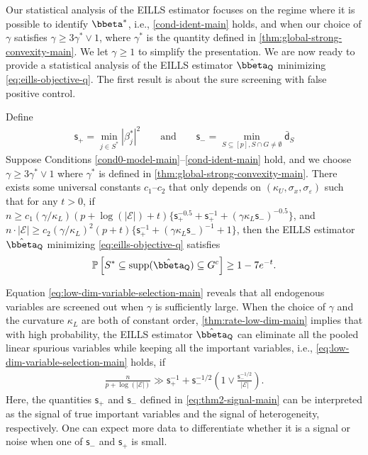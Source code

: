 \documentclass[10pt]{article}
\numberwithin{equation}{section}
\newcommand*{\supp}{\mathrm{supp}}
\begin{document}
{Our statistical analysis of the EILLS estimator focuses on the regime where it is possible to identify $\bbeta^*$, i.e., \cref{cond-ident-main} holds, and when our choice of $\gamma$ satisfies $\gamma \ge 3\gamma^* \lor 1$, where $\gamma^*$ is the quantity defined in  \cref{thm:global-strong-convexity-main}. We let $\gamma \ge 1$ to simplify the presentation. We are now ready to provide a statistical analysis of the EILLS estimator $\hat{\bbeta}_{\mathsf{Q}}$ minimizing \eqref{eq:eills-objective-q}.  The first result is about the sure screening with false positive control.
\begin{theorem}
\label{thm:rate-low-dim-main} Define
\begin{align}
\label{eq:thm2-signal-main}
    \mathsf{s}_+ = \min_{j\in S^*} |\beta_j^*|^2 \qquad \text{and} \qquad \mathsf{s}_- = \min_{S\subseteq [p], S\cap G \neq \emptyset} \bar{\mathsf{d}}_S
\end{align} 
Suppose Conditions \ref{cond0-model-main}--\ref{cond-ident-main} hold, and we choose $\gamma \ge 3\gamma^*\lor 1$ where $\gamma^*$ is defined in  \cref{thm:global-strong-convexity-main}. There exists some universal constants $c_1$--$c_2$ that only depends on $(\kappa_U, \sigma_x, \sigma_\varepsilon)$ such that for any $t>0$, if $n \ge c_1(\gamma/\kappa_L)(p+ \log(|\mathcal{E}|) + t)\{\mathsf{s}_+^{-0.5}+\mathsf{s}_+^{-1}+(\gamma\kappa_L\mathsf{s}_-)^{-0.5}\}$, and $n \cdot |\mathcal{E}| \ge c_2(\gamma/\kappa_L)^2(p+t)\{\mathsf{s}_+^{-1} + (\gamma\kappa_L\mathsf{s}_-)^{-1} + 1\}$, then the EILLS estimator $\hat{\bbeta}_{\mathsf{Q}}$ minimizing \eqref{eq:eills-objective-q} satisfies
\begin{align}
\label{eq:low-dim-variable-selection-main}
    \mathbb{P}\left[S^* \subseteq \supp(\hat{\bbeta}_{\mathsf{Q}}) \subseteq G^c \right] \ge 1-7e^{-t}.
\end{align}
\end{theorem}


Equation \eqref{eq:low-dim-variable-selection-main} reveals that all endogenous variables are screened out when $\gamma$ is sufficiently large. When the choice of $\gamma$ and the curvature $\kappa_L$ are both of constant order, \cref{thm:rate-low-dim-main} implies that with high probability, the EILLS estimator $\hat{\bbeta}_{\mathsf{Q}}$ can eliminate all the pooled linear spurious variables while keeping all the important variables, i.e., \eqref{eq:low-dim-variable-selection-main} holds, if 
\begin{align}
\label{eq:low-dim-n-m-condition-main}
    \frac{n}{p + \log(|\mathcal{E}|)} \gg \mathsf{s}_+^{-1} + \mathsf{s}_{-}^{-1/2} \left(1\lor \frac{\mathsf{s}_{-}^{-1/2}}{|\mathcal{E}|}\right).
\end{align}  Here, the quantities $\mathsf{s}_+$ and $\mathsf{s}_-$ defined in \eqref{eq:thm2-signal-main} can be interpreted as the signal of true important variables and the signal of heterogeneity, respectively. One can expect more data to differentiate whether it is a signal or noise when one of $\mathsf{s}_-$ and $\mathsf{s}_+$ is small. 



}
\end{document}
